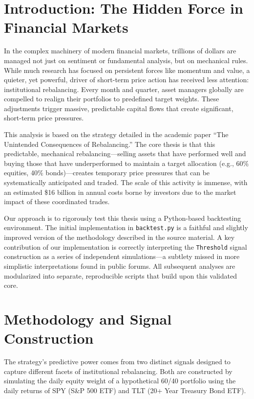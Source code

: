 \documentclass{article}
\begin{document}
\section{Introduction: The Hidden Force in Financial Markets}
In the complex machinery of modern financial markets, trillions of dollars are managed not just on sentiment or fundamental analysis, but on mechanical rules. While much research has focused on persistent forces like momentum and value, a quieter, yet powerful, driver of short-term price action has received less attention: institutional rebalancing. Every month and quarter, asset managers globally are compelled to realign their portfolios to predefined target weights. These adjustments trigger massive, predictable capital flows that create significant, short-term price pressures.

This analysis is based on the strategy detailed in the academic paper ``The Unintended Consequences of Rebalancing.'' The core thesis is that this predictable, mechanical rebalancing---selling assets that have performed well and buying those that have underperformed to maintain a target allocation (e.g., 60\% equities, 40\% bonds)---creates temporary price pressures that can be systematically anticipated and traded. The scale of this activity is immense, with an estimated \$16 billion in annual costs borne by investors due to the market impact of these coordinated trades.

Our approach is to rigorously test this thesis using a Python-based backtesting environment. The initial implementation in \texttt{backtest.py} is a faithful and slightly improved version of the methodology described in the source material. A key contribution of our implementation is correctly interpreting the \texttt{Threshold} signal construction as a series of independent simulations---a subtlety missed in more simplistic interpretations found in public forums. All subsequent analyses are modularized into separate, reproducible scripts that build upon this validated core.

\section{Methodology and Signal Construction}
The strategy's predictive power comes from two distinct signals designed to capture different facets of institutional rebalancing. Both are constructed by simulating the daily equity weight of a hypothetical 60/40 portfolio using the daily returns of SPY (S\&P 500 ETF) and TLT (20+ Year Treasury Bond ETF).
\end{document}
